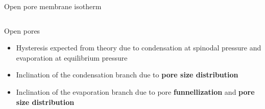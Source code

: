 \documentclass[../defence.tex]{subfiles}
\begin{document}
\begin{frame}{Open pore membrane isotherm}
\begin{columns}[onlytextwidth, T]
        \begin{block}{Open pores}
          \begin{itemize}
            \item Hysteresis expected from theory due to condensation at spinodal pressure and evaporation at equilibrium pressure
            \pause

            \item Inclination of the condensation branch due to \textbf{pore size distribution}
            \pause

            \item Inclination of the evaporation branch due to pore \textbf{funnellization} and \textbf{pore size distribution}
          \end{itemize}
        \end{block}
      \pause


\end{columns}
\end{frame}
\end{document}

